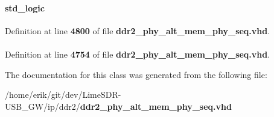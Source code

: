 \paragraph[{U\+S\+E\+\_\+\+I\+R\+AM}]{ {\bfseries \textcolor{vhdlchar}{ }} {\bfseries \textcolor{comment}{std\+\_\+logic}\textcolor{vhdlchar}{ }} \hspace{0.3cm}{\ttfamily [Generic]}}\label{classddr2__phy__alt__mem__phy__mmi_a4543d47d7a820e37c14d702521ad851b}


Definition at line {\bf 4800} of file {\bf ddr2\+\_\+phy\+\_\+alt\+\_\+mem\+\_\+phy\+\_\+seq.\+vhd}.

\paragraph[{work}]{\hspace{0.3cm}{\ttfamily [Library]}}\label{classddr2__phy__alt__mem__phy__mmi_a9f49de6f5eed5b4488cba6c9cdd1c215}


Definition at line {\bf 4754} of file {\bf ddr2\+\_\+phy\+\_\+alt\+\_\+mem\+\_\+phy\+\_\+seq.\+vhd}.



The documentation for this class was generated from the following file\+:\begin{DoxyCompactItemize}
\item 
/home/erik/git/dev/\+Lime\+S\+D\+R-\/\+U\+S\+B\+\_\+\+G\+W/ip/ddr2/{\bf ddr2\+\_\+phy\+\_\+alt\+\_\+mem\+\_\+phy\+\_\+seq.\+vhd}\end{DoxyCompactItemize}
